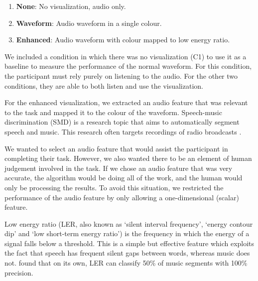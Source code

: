 \begin{enumerate}[label=C\arabic*.]
  \item \textbf{None}: No visualization, audio only.
  \item \textbf{Waveform}: Audio waveform in a single colour.
  \item \textbf{Enhanced}: Audio waveform with colour mapped to low energy ratio.
\end{enumerate}

We included a condition in which there was no visualization (C1) to use it as a baseline to measure the performance of
the normal waveform. For this condition, the participant must rely purely on listening to the audio.  For the other two
conditions, they are able to both listen and use the visualization.

For the enhanced visualization, we extracted an audio feature that was relevant to the task and mapped it to the colour
of the waveform.
Speech-music discrimination (SMD) is a research topic that aims to automatically segment speech and music.  This
research often targets recordings of radio broadcasts
\citep{Goodwin2004,Wieser2014,Saunders1996,Pikrakis2008,Pikrakis2006a}.

We wanted to select an audio feature that would assist the participant in completing their task.  However, we also
wanted there to be an element of human judgement involved in the task. If we chose an audio feature that was very
accurate, the algorithm would be doing all of the work, and the human would only be processing the results.  To avoid
this situation, we restricted the performance of the audio feature by only allowing a one-dimensional (scalar) feature.

Low energy ratio (LER, also known as `silent interval frequency', `energy contour dip' and `low short-term energy
ratio') is the frequency in which the energy of a signal falls below a threshold. This is a simple but effective
feature which exploits the fact that speech has frequent silent gaps between words, whereas music does not.
\citet{Panagiotakis2005} found that on its own, LER can classify 50\% of music segments with 100\% precision.

